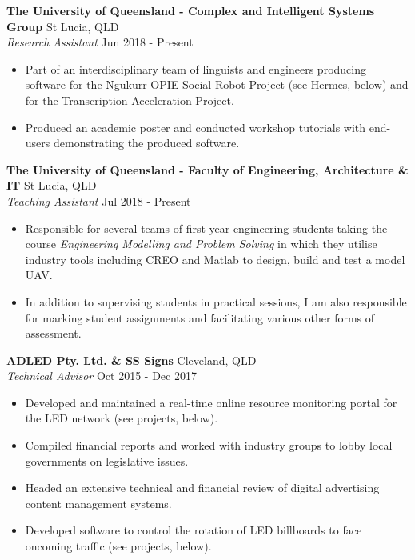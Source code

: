 \documentclass[a4paper]{article}
\newenvironment{myitemize}
{   \small
    \vspace{-2pt}
    \begin{itemize}
    \setlength{\itemsep}{0pt}
    \setlength{\parskip}{0pt}
    \setlength{\parsep}{0pt}     }
{ \end{itemize}                  }
\begin{document}
\textbf{The University of Queensland - Complex and Intelligent Systems Group} \hfill St Lucia, QLD\\
\textit{Research Assistant} \hfill Jun 2018 - Present\\
\begin{myitemize} \itemsep 0.75mm
	\item Part of an interdisciplinary team of linguists and engineers producing software for the Ngukurr OPIE Social Robot Project (see Hermes, below) and for the Transcription Acceleration Project.
	\item Produced an academic poster and conducted workshop tutorials with end-users demonstrating the produced software.
\end{myitemize}
\vspace{-1mm}
\textbf{The University of Queensland - Faculty of Engineering, Architecture \& IT} \hfill St Lucia, QLD\\
\textit{Teaching Assistant} \hfill Jul 2018 - Present\\
\begin{myitemize} \itemsep 0.75mm
	\item Responsible for several teams of first-year engineering students taking the course \textit{Engineering Modelling and Problem Solving} in which they utilise industry tools including CREO and Matlab to design, build and test a model UAV.
	\item In addition to supervising students in practical sessions, I am also responsible for marking student assignments and facilitating various other forms of assessment. 
\end{myitemize}
\vspace{-1mm}
\textbf{ADLED Pty. Ltd. \& SS Signs} \hfill Cleveland, QLD\\
\textit{Technical Advisor} \hfill Oct 2015 - Dec 2017\\
\begin{myitemize} \itemsep 0.75mm
	\item Developed and maintained a real-time online resource monitoring portal for the LED network (see projects, below).
	\item Compiled financial reports and worked with industry groups to lobby local governments on legislative issues.
	\item Headed an extensive technical and financial review of digital advertising content management systems.
	\item Developed software to control the rotation of LED billboards to face oncoming traffic (see projects, below).
\end{myitemize}
\end{document}
